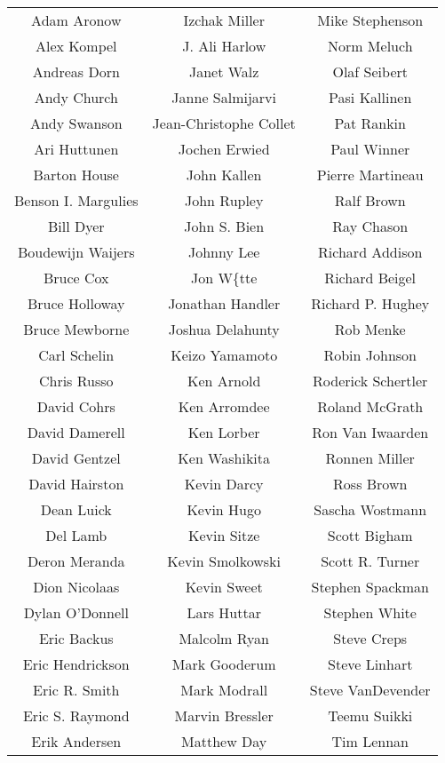\begin{center}
\begin{tabular}{ccc}
Adam Aronow & Izchak Miller & Mike Stephenson\\
Alex Kompel & J. Ali Harlow & Norm Meluch\\
Andreas Dorn & Janet Walz & Olaf Seibert\\
Andy Church & Janne Salmijarvi & Pasi Kallinen\\
Andy Swanson & Jean-Christophe Collet & Pat Rankin\\
Ari Huttunen & Jochen Erwied & Paul Winner\\
Barton House & John Kallen & Pierre Martineau\\
Benson I. Margulies & John Rupley & Ralf Brown\\
Bill Dyer & John S. Bien & Ray Chason\\
Boudewijn Waijers & Johnny Lee & Richard Addison\\
Bruce Cox & Jon W\{tte & Richard Beigel\\
Bruce Holloway & Jonathan Handler & Richard P. Hughey\\
Bruce Mewborne & Joshua Delahunty & Rob Menke\\
Carl Schelin & Keizo Yamamoto & Robin Johnson\\
Chris Russo & Ken Arnold & Roderick Schertler\\
David Cohrs & Ken Arromdee & Roland McGrath\\
David Damerell & Ken Lorber & Ron Van Iwaarden\\
David Gentzel & Ken Washikita & Ronnen Miller\\
David Hairston & Kevin Darcy & Ross Brown\\
Dean Luick & Kevin Hugo & Sascha Wostmann\\
Del Lamb & Kevin Sitze & Scott Bigham\\
Deron Meranda & Kevin Smolkowski & Scott R. Turner\\
Dion Nicolaas & Kevin Sweet & Stephen Spackman\\
Dylan O'Donnell & Lars Huttar & Stephen White\\
Eric Backus & Malcolm Ryan & Steve Creps\\
Eric Hendrickson & Mark Gooderum & Steve Linhart\\
Eric R. Smith & Mark Modrall & Steve VanDevender\\
Eric S. Raymond & Marvin Bressler & Teemu Suikki\\
Erik Andersen & Matthew Day & Tim Lennan\\

\end{tabular}
\end{center}
